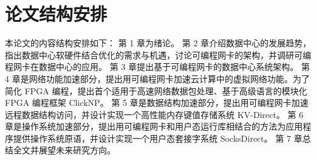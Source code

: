 \section{论文结构安排}

本论文的内容结构安排如下：
第 1 章为绪论。
第 2 章介绍数据中心的发展趋势，指出数据中心软硬件结合优化的需求与机遇，讨论可编程网卡的架构，并调研可编程网卡在数据中心的应用。
第 3 章提出基于可编程网卡的数据中心系统架构。
第 4 章是网络功能加速部分，提出用可编程网卡加速云计算中的虚拟网络功能。为了简化 FPGA 编程，提出首个适用于高速网络数据包处理、基于高级语言的模块化 FPGA 编程框架 ClickNP。
第 5 章是数据结构加速部分，提出用可编程网卡加速远程数据结构访问，并设计实现一个高性能内存键值存储系统 KV-Direct。
第 6 章是操作系统加速部分，提出用可编程网卡和用户态运行库相结合的方法为应用程序提供操作系统原语，并设计实现一个用户态套接字系统 SocksDirect。
第 7 章总结全文并展望未来研究方向。